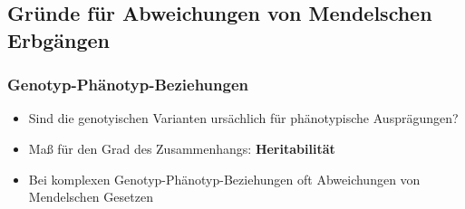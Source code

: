 \subsection{Gründe für Abweichungen von Mendelschen Erbgängen}
\subsubsection{Genotyp-Phänotyp-Beziehungen}
\begin{itemize}
    \item Sind die genotyischen Varianten ursächlich für phänotypische Ausprägungen?
    \item Maß für den Grad des Zusammenhangs: \textbf{Heritabilität}
    \item Bei komplexen Genotyp-Phänotyp-Beziehungen oft Abweichungen von Mendelschen Gesetzen
\end{itemize}

